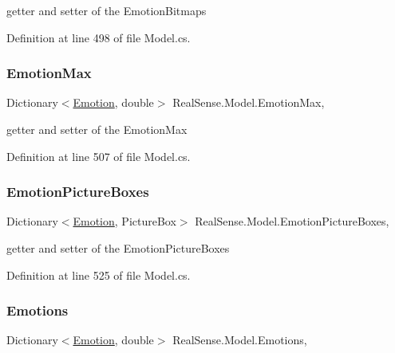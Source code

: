 getter and setter of the Emotion\+Bitmaps 

Definition at line 498 of file Model.\+cs.

\mbox{\label{class_real_sense_1_1_model_ac5454f63dfead405cd1d9c229cf6790f}} 
\subsubsection{\texorpdfstring{Emotion\+Max}{EmotionMax}}
{\footnotesize\ttfamily Dictionary$<$\hyperlink{class_real_sense_1_1_model_a5bf3fde8f53519f7a740d8b4e0399208}{Emotion}, double$>$ Real\+Sense.\+Model.\+Emotion\+Max\hspace{0.3cm}{\ttfamily [get]}, {\ttfamily [set]}}

getter and setter of the Emotion\+Max 

Definition at line 507 of file Model.\+cs.

\mbox{\label{class_real_sense_1_1_model_ad2c87f308e42010ca032deec5cfa5e0b}} 
\subsubsection{\texorpdfstring{Emotion\+Picture\+Boxes}{EmotionPictureBoxes}}
{\footnotesize\ttfamily Dictionary$<$\hyperlink{class_real_sense_1_1_model_a5bf3fde8f53519f7a740d8b4e0399208}{Emotion}, Picture\+Box$>$ Real\+Sense.\+Model.\+Emotion\+Picture\+Boxes\hspace{0.3cm}{\ttfamily [get]}, {\ttfamily [set]}}

getter and setter of the Emotion\+Picture\+Boxes 

Definition at line 525 of file Model.\+cs.

\mbox{\label{class_real_sense_1_1_model_a30358a7ea8e1e59815e2f562a3fc6bad}} 
\subsubsection{\texorpdfstring{Emotions}{Emotions}}
{\footnotesize\ttfamily Dictionary$<$\hyperlink{class_real_sense_1_1_model_a5bf3fde8f53519f7a740d8b4e0399208}{Emotion}, double$>$ Real\+Sense.\+Model.\+Emotions\hspace{0.3cm}{\ttfamily [get]}, {\ttfamily [set]}}

